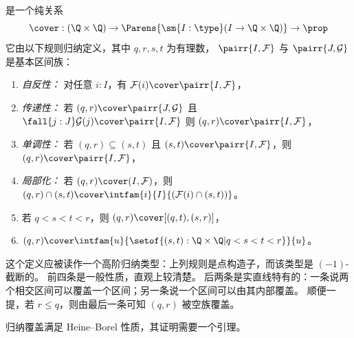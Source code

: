 \begin{defn} \label{defn:inductive-cover}
  是一个纯关系
  \begin{equation*}
    {\cover} : (\Q \times \Q) \to \Parens{\sm{I : \type} (I \to \Q \times \Q)} \to \prop
  \end{equation*}
  它由以下规则归纳定义，其中 $q, r, s, t$ 为有理数，
  $\pairr{I, \mathcal{F}}$ 与 $\pairr{J, \mathcal{G}}$ 是基本区间族：
  \begin{enumerate}

  \item \emph{自反性：}
    对任意 $i : I$，有 $\mathcal{F}(i) \cover \pairr{I, \mathcal{F}}$，

  \item \emph{传递性：}
    若 $(q, r) \cover \pairr{J, \mathcal{G}}$ 且 $\fall{j : J} \mathcal{G}(j) \cover \pairr{I,\mathcal{F}}$
    则 $(q, r) \cover \pairr{I, \mathcal{F}}$，

  \item \emph{单调性：}
    若 $(q, r) \subseteq (s, t)$ 且 $(s,t) \cover \pairr{I, \mathcal{F}}$，则 $(q, r) \cover
    \pairr{I, \mathcal{F}}$，

  \item \emph{局部化：}
    若 $(q, r) \cover (I, \mathcal{F})$，则 $(q, r) \cap (s, t) \cover
    \intfam{i}{I}{(\mathcal{F}(i) \cap (s, t))}$。

  \item \label{defn:inductive-cover-interval-1}
    若 $q < s < t < r$，则 $(q, r) \cover [(q, t), (s, r)]$，

  \item \label{defn:inductive-cover-interval-2}
    $(q, r) \cover \intfam{u}{\setof{ (s,t) : \Q \times \Q | q < s < t < r}}{u}$。
  \end{enumerate}
\end{defn}

这个定义应被读作一个高阶归纳类型：上列规则是点构造子，而该类型是 $(-1)$-截断的。
前四条是一般性质，直观上较清楚。
后两条是实直线特有的：一条说两个相交区间可以覆盖一个区间；另一条说一个区间可以由其内部覆盖。
顺便一提，若 $r
\leq q$，则由最后一条可知 $(q, r)$ 被空族覆盖。

归纳覆盖满足 Heine--Borel 性质，其证明需要一个引理。

